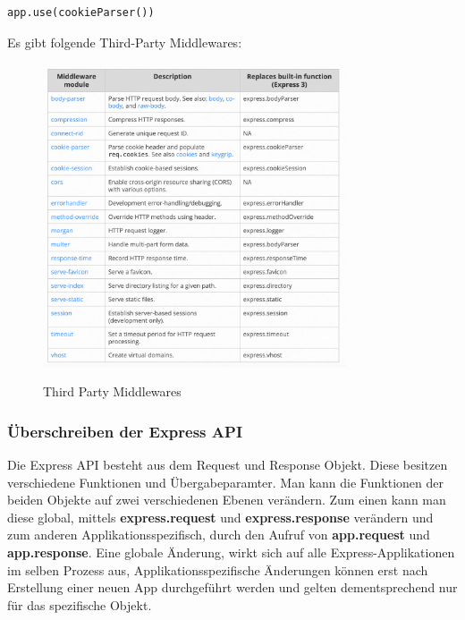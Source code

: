 \begin{itemize}
\begin{lstlisting}[caption=Third-Party Middleware]
            app.use(cookieParser())
        \end{lstlisting}
        \newpage
        Es gibt folgende Third-Party Middlewares:\newline
        \begin{figure}[h!]
            \centering
            \includegraphics[width=0.8\textwidth]{pics/Third-Party-Middleware.png}
            \caption{Third Party Middlewares}
            \cite{Express_js_third_party_middlewares}
            \label{fig:enter-label}
        \end{figure}
\end{itemize}
\cite{Express_js_writing_middleware}
\cite{Express_js_using_middleware}
\cite{Express_js_middleware_help_1}

\subsubsection{Überschreiben der Express API}
Die Express API besteht aus dem Request und Response Objekt. Diese besitzen verschiedene Funktionen und Übergabeparamter. Man kann die Funktionen der beiden Objekte auf zwei verschiedenen Ebenen verändern. Zum einen kann man diese global, mittels \textbf{express.request} und \textbf{express.response} verändern und zum anderen Applikationsspezifisch, durch den Aufruf von \textbf{app.request} und \textbf{app.response}. Eine globale Änderung, wirkt sich auf alle Express-Applikationen im selben Prozess aus, Applikationsspezifische Änderungen können erst nach Erstellung einer neuen App durchgeführt werden und gelten dementsprechend nur für das spezifische Objekt. 

